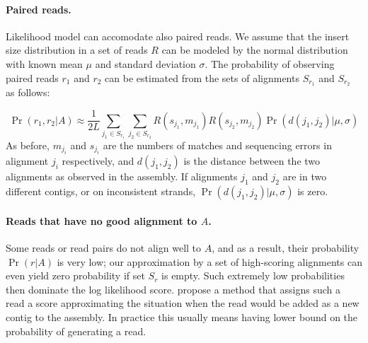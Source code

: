 \paragraph{Paired reads.}
Likelihood model can accomodate also paired reads.
We assume that the insert size distribution in a set of reads $R$ 
can be modeled by the normal
distribution with known mean $\mu$ and standard deviation $\sigma$.
The probability of observing paired reads $r_1$ and $r_2$ 
can be estimated from the sets of alignments $S_{r_1}$ and $S_{r_2}$ as follows:

\begin{equation}
\Pr(r_1, r_2|A) \approx 
\frac{1}{2L}
\displaystyle\sum_{j_1 \in S_{r_1}} 
\displaystyle\sum_{j_2 \in S_{r_2}} 
R(s_{j_1}, m_{j_1}) R(s_{j_2}, m_{j_2})
\Pr(d(j_1, j_2)|\mu, \sigma)
\end{equation}
As before, $m_{j_i}$ and $s_{j_i}$ are the numbers of matches and
sequencing errors in alignment $j_i$ respectively, 
and $d(j_1,j_2)$ is the distance between the two alignments
as observed in the assembly. 
If alignments $j_1$ and $j_2$ are in two different contigs,
or on inconsistent strands, $\Pr(d(j_1, j_2)|\mu, \sigma)$ is zero.

\paragraph{Reads that have no good alignment to $A$.}
Some reads or read pairs do not align well to $A$, and as a result, their
probability $\Pr(r|A)$ is very low; our approximation by a set of
high-scoring alignments can even yield zero probability if set $S_r$
is empty.  Such extremely low probabilities then dominate the log
likelihood score.  \cite{Ghodsi2013} propose a method that assigns
such a read a score approximating the situation when the read would be
added as a new contig to the assembly. In practice this usually
means having lower bound on the probability of generating a read.

